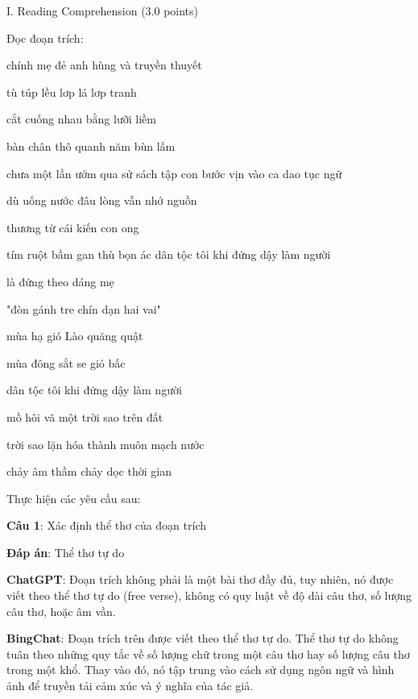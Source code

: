 \documentclass{article}
\begin{document}
{	
	
	\begin{mdframed}[linewidth=1pt,linecolor=red] 
		I. Reading Comprehension (3.0 points)
		
Đọc đoạn trích: 
		\begin{multicols}{2}


			chính mẹ đẻ anh hùng và truyền thuyết 
			
			tù túp lều lơp lá lơp tranh 
			
			cắt cuống nhau bằng lưỡi liềm 
			
			bàn chân thô quanh năm bùn lấm 
			
			chưa một lần ướm qua sử sách
			tập con bước vịn vào ca dao tục ngữ 
			
			dù uống nước đâu lòng vẫn nhớ nguồn 
			
			thương từ cái kiến con ong 
			
			tím ruột bầm gan thù bọn ác 
			dân tộc tôi khi đứng dậy làm người 
			
			là đứng theo dáng mẹ 
			
			"đòn gánh tre chín dạn hai vai"
			
			mùa hạ gió Lào quăng quật
			
			mùa đông sắt se gió bấc 
			
			dân tộc tôi khi đứng dậy làm người 
			
			mồ hôi vã một trời sao trên đất 
			
			trời sao lặn hóa thành muôn mạch nước 
			
			chảy âm thầm chảy dọc thời gian	 
			
\end{multicols}
		Thực hiện các yêu cầu sau: 
		
		\textbf{Câu 1}: Xác định thể thơ của đoạn trích 
		
		\textbf{Đáp án}: Thể thơ tự do 
		
		\textbf{ChatGPT}: Đoạn trích không phải là một bài thơ đầy đủ, tuy nhiên, nó được viết theo thể thơ tự do (free verse), không có quy luật về độ dài câu thơ, số lượng câu thơ, hoặc âm vần. 
		
		\textbf{BingChat}: Đoạn trích trên được viết theo thể thơ tự do. Thể thơ tự do không tuân theo những quy tắc về số lượng chữ trong một câu thơ hay số lượng câu thơ trong một khổ. Thay vào đó, nó tập trung vào cách sử dụng ngôn ngữ và hình ảnh để truyền tải cảm xúc và ý nghĩa của tác giả.
		
	\end{mdframed}
	
}
\end{document}
